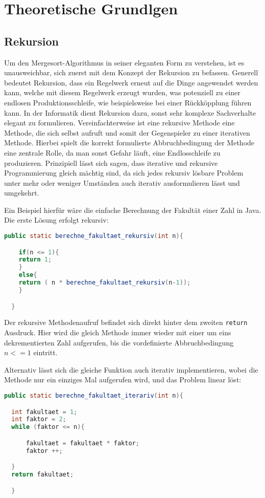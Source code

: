 \chapter{Theoretische Grundlgen}\label{chap:theoretische-grundlagen}
\section{Rekursion}
Um den Mergesort-Algorithmus in seiner eleganten Form zu verstehen, ist es unausweichbar, sich zuerst mit dem
Konzept der Rekursion zu befassen. Generell bedeutet Rekursion, dass ein Regelwerk erneut auf die Dinge angewendet werden kann,
welche mit diesem Regelwerk erzeugt wurden, was potenziell zu einer endlosen Produktionsschleife, wie beispielsweise bei einer Rückköpplung
führen kann. In der Informatik dient Rekursion dazu, sonst sehr komplexe Sachverhalte elegant zu formulieren. Vereinfachterweise ist eine rekursive Methode
eine Methode, die sich selbst aufruft und somit der Gegenspieler zu einer iterativen Methode. Hierbei spielt die korrekt formulierte Abbruchbedingung der Methode eine zentrale Rolle, da man sonst Gefahr läuft,
eine Endlosschleife zu produzieren. Prinzipiell lässt sich sagen, dass iterative und rekursive Programmierung gleich mächtig sind, da sich jedes rekursiv lösbare Problem
unter mehr oder weniger Umständen auch iterativ ausformulieren lässt und umgekehrt.

Ein Beispiel hierfür wäre die einfache Berechnung der Fakultät einer Zahl in Java. Die erste Lösung erfolgt rekursiv:

\begin{lstlisting}[language=Java]
  public static berechne_fakultaet_rekursiv(int n){

    if(n <= 1){
    return 1;
    }
    else{
    return ( n * berechne_fakultaet_rekursiv(n-1));
    }

  }
\end{lstlisting}

Der rekursive Methodenaufruf befindet sich direkt hinter dem zweiten \texttt{return} Ausdruck. Hier wird die gleich Methode immer wieder
mit einer um eins dekrementierten Zahl aufgerufen, bis die vordefinierte Abbruchbedingung $n <= 1$ eintritt.

Alternativ lässt sich die gleiche Funktion auch iterativ implementieren, wobei die Methode nur ein einziges Mal aufgerufen wird,
und das Problem linear löst:

\begin{lstlisting}[language=Java]
  public static berechne_fakultaet_iterariv(int n){

  int fakultaet = 1;
  int faktor = 2;
  while (faktor <= n){

      fakultaet = fakultaet * faktor;
      faktor ++;

  }
  return fakultaet;

  }
\end{lstlisting}

